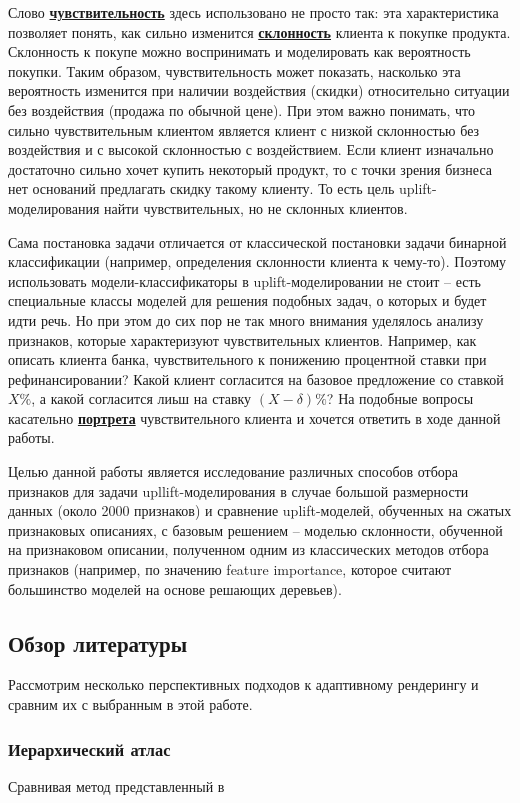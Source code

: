 \par
Слово \textbf{\underline{чувствительность}} здесь использовано не просто так: эта характеристика позволяет понять, как сильно изменится \textbf{\underline{склонность}} клиента к покупке продукта. Склонность к покупе можно воспринимать и моделировать как вероятность покупки. Таким образом, чувствительность может показать, насколько эта вероятность изменится при наличии воздействия (скидки) относительно ситуации без воздействия (продажа по обычной цене). При этом важно понимать, что сильно чувствительным клиентом является клиент с низкой склонностью без воздействия и с высокой склонностью с воздействием. Если клиент изначально достаточно сильно хочет купить некоторый продукт, то с точки зрения бизнеса нет оснований предлагать скидку такому клиенту. То есть цель uplift-моделирования найти чувствительных, но не склонных клиентов.

\par
Сама постановка задачи отличается от классической постановки задачи бинарной классификации (например, определения склонности клиента к чему-то). Поэтому использовать модели-классификаторы в uplift-моделировании не стоит -- есть специальные классы моделей для решения подобных задач, о которых и будет идти речь. Но при этом до сих пор не так много внимания уделялось анализу признаков, которые характеризуют чувствительных клиентов. Например, как описать клиента банка, чувствительного к понижению процентной ставки при рефинансировании? Какой клиент согласится на базовое предложение со ставкой $X\%$, а какой согласится лиьш на ставку $(X-\delta)\%$? На подобные вопросы касательно \textbf{\underline{портрета}} чувствительного клиента и хочется ответить в ходе данной работы.

\par 
Целью данной работы является исследование различных способов отбора признаков для задачи upllift-моделирования в случае большой размерности данных (около 2000 признаков) и сравнение uplift-моделей, обученных на сжатых признаковых описаниях, с базовым решением -- моделью склонности, обученной на признаковом описании, полученном одним из классических методов отбора признаков (например, по значению feature importance, которое считают большинство моделей на основе решающих деревьев).















\fi


\subsection{Обзор литературы}
\label{sec:related}
Рассмотрим несколько перспективных подходов к адаптивному рендерингу и сравним их с выбранным в этой работе.


\subsubsection{Иерархический атлас}
Сравнивая метод представленный в \cite{niski2007multi} 